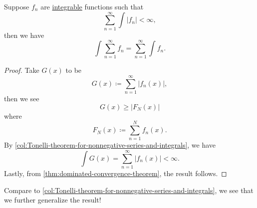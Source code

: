 \begin{corollary}\label{col:Tonelli-theorem-for-series-and-integrals}
	Suppose \(f_{n}\) are \hyperref[def:integrable]{integrable} functions such that
	\[
		\sum\limits_{n=1}^{\infty} \int \left\vert f_{n} \right\vert < \infty,
	\]
	then we have
	\[
		\int \sum\limits_{n=1}^{\infty} f_{n} = \sum\limits_{n=1}^{\infty} \int f_{n}.
	\]
\end{corollary}
\begin{proof}
	Take \(G(x)\) to be
	\[
		G(x) \coloneqq \sum\limits_{n=1}^{\infty} \left\vert f_{n}(x) \right\vert,
	\]
	then we see
	\[
		G(x) \geq \left\vert F_{N}(x) \right\vert
	\]
	where
	\[
		F_{N}(x) \coloneqq \sum\limits_{n=1}^{N} f_{n}(x).
	\]
	By \autoref{col:Tonelli-theorem-for-nonnegative-series-and-integrals}, we have
	\[
		\int G(x) = \sum\limits_{n=1}^{\infty} \left\vert f_{n}(x) \right\vert < \infty .
	\]
	Lastly, from \autoref{thm:dominated-convergence-theorem}, the result follows.
\end{proof}
\begin{remark}
	Compare to \autoref{col:Tonelli-theorem-for-nonnegative-series-and-integrals}, we see that we further generalize the result!
\end{remark}